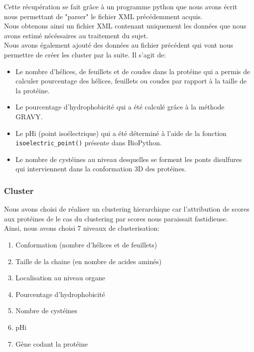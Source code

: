 Cette récupération se fait grâce à un programme python que nous avons écrit nous permettant de "parser" le fichier XML précédemment acquis.\\
Nous obtenons ainsi un fichier XML contenant uniquement les données que nous avons estimé nécéssaires au traitement du sujet.\\
Nous avons également ajouté des données au fichier précédent qui vont nous permettre de créer les cluster par la suite. Il s'agit de:
\begin{itemize}
\item Le nombre d'hélices, de feuillets et de coudes dans la protéine qui a permis de calculer pourcentage des hélices, feuillets ou coudes par rapport à la taille de la protéine.
\item Le pourcentage d'hydrophobicité qui a été calculé gr\^ace à la méthode GRAVY.
\item Le pHi (point isoélectrique) qui a été déterminé à l'aide de la fonction \texttt{isoelectric\_point()} présente dans BioPython.
\item Le nombre de cystéines au niveau desquelles se forment les ponts disulfures qui interviennent dans la conformation 3D des protéines.
\end{itemize}

\pagebreak
\subsubsection*{Cluster}
Nous avons choisi de réaliser un clustering hierarchique car l'attribution de scores aux protéines de le cas du clustering par scores nous paraissait fastidieuse.\\
Ainsi, nous avons choisi 7 niveaux de clusterisation:
\begin{enumerate}
\item Conformation (nombre d'hélices et de feuillets)
\item Taille de la chaine (en nombre de acides aminés)
\item Localisation au niveau organe
\item Pourcentage d'hydrophobicité
\item Nombre de cystéines
\item pHi
\item Gène codant la protéine
\end{enumerate}


